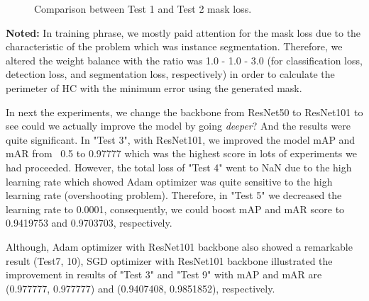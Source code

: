 	\begin{figure}[H]
		\centering
		\hfill %
		\hfill %
		\caption{Comparison between Test 1 and Test 2  mask loss.}
		\label{fig:mask_loss_12}
	\end{figure}

\noindent	
	\textbf{Noted:} In training phrase, we mostly paid attention for the mask loss due to the characteristic of the problem which was instance segmentation. Therefore, we altered the weight balance with the ratio was 1.0 - 1.0 - 3.0 (for classification loss, detection loss, and segmentation loss, respectively) in order to calculate the perimeter of HC with the minimum error using the generated mask.
	
 	In next the experiments, we change the backbone from ResNet50 to ResNet101 to see could we actually improve the model by going \textit{deeper}? And the results were quite significant. In "Test 3", with ResNet101, we improved the model mAP and mAR from ~0.5 to 0.97777 which was the highest score in lots of experiments we had proceeded. However, the total loss of "Test 4" went to NaN due to the high learning rate which showed Adam optimizer was quite sensitive to the high learning rate (overshooting problem). Therefore, in "Test 5" we decreased the learning rate to 0.0001, consequently, we could boost mAP and mAR score to 0.9419753 and 0.9703703, respectively.
	
	Although, Adam optimizer with ResNet101 backbone also showed a remarkable result (Test7, 10), SGD optimizer with ResNet101 backbone illustrated the improvement in results of "Test 3" and "Test 9" with mAP and mAR are (0.977777, 0.977777) and (0.9407408, 0.9851852), respectively.
	

